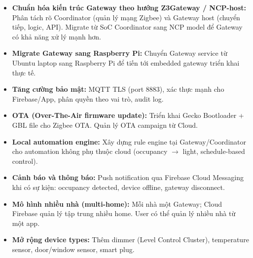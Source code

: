 \begin{itemize}
    \item \textbf{Chuẩn hóa kiến trúc Gateway theo hướng Z3Gateway / NCP-host:}
    Phân tách rõ Coordinator (quản lý mạng Zigbee) và Gateway host (chuyển tiếp, logic, API). Migrate từ SoC Coordinator sang NCP model để Gateway có khả năng xử lý mạnh hơn.

    \item \textbf{Migrate Gateway sang Raspberry Pi:}
    Chuyển Gateway service từ Ubuntu laptop sang Raspberry Pi để tiến tới embedded gateway triển khai thực tế.

    \item \textbf{Tăng cường bảo mật:}
    MQTT TLS (port 8883), xác thực mạnh cho Firebase/App, phân quyền theo vai trò, audit log.

    \item \textbf{OTA (Over-The-Air firmware update):}
    Triển khai Gecko Bootloader + GBL file cho Zigbee OTA. Quản lý OTA campaign từ Cloud.

    \item \textbf{Local automation engine:}
    Xây dựng rule engine tại Gateway/Coordinator cho automation không phụ thuộc cloud (occupancy $\rightarrow$ light, schedule-based control).

    \item \textbf{Cảnh báo và thông báo:}
    Push notification qua Firebase Cloud Messaging khi có sự kiện: occupancy detected, device offline, gateway disconnect.

    \item \textbf{Mô hình nhiều nhà (multi-home):}
    Mỗi nhà một Gateway; Cloud Firebase quản lý tập trung nhiều home. User có thể quản lý nhiều nhà từ một app.

    \item \textbf{Mở rộng device types:}
    Thêm dimmer (Level Control Cluster), temperature sensor, door/window sensor, smart plug.
\end{itemize}

